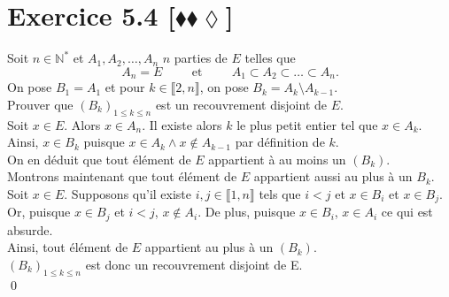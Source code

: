 \documentclass[10pt]{article}
\begin{document}
\section*{Exercice 5.4 [$\blacklozenge\blacklozenge\lozenge$]}
\begin{tcolorbox}[enhanced, width=7in, center, size=fbox, fontupper=\large, drop shadow southwest]
    Soit $n \in \mathbb{N}^*$ et $A_1, A_2, \dots, A_n$ $n$ parties de $E$ telles que
    \begin{equation*}
        A_n = E \hspace{1cm} \text{et} \hspace{1cm} A_1 \subset A_2 \subset \dots \subset A_n.
    \end{equation*}
    On pose $B_1=A_1$ et pour $k \in \llbracket{2, n}\rrbracket$, on pose $B_k = A_k \setminus A_{k-1}$.\\
    Prouver que $(B_k)_{1 \leq k \leq n}$ est un recouvrement disjoint de $E$.\\[0.25cm]
    Soit $x \in E$. Alors $x \in A_n$. Il existe alors $k$ le plus petit entier tel que $x \in A_k$. Ainsi, $x \in B_k$ puisque $x \in A_k \wedge x \notin A_{k-1}$ par définition de $k$.\\
    On en déduit que tout élément de $E$ appartient à au moins un $(B_k)$.\\[0.25cm]
    Montrons maintenant que tout élément de $E$ appartient aussi au plus à un $B_k$.\\
    Soit $x \in E$. Supposons qu'il existe $i,j \in \llbracket1,n\rrbracket$ tels que $i < j$ et $x \in B_i$ et $x \in B_j$.\\
    Or, puisque $x \in B_j$ et $i<j$, $x \notin A_i$. De plus, puisque $x \in B_i$, $x \in A_i$ ce qui est absurde.\\
    Ainsi, tout élément de $E$ appartient au plus à un $(B_k)$.\\[0.25cm]
    $(B_k)_{1 \leq k \leq n}$ est donc un recouvrement disjoint de E.\\
    \qed
\end{tcolorbox}

\end{document}
